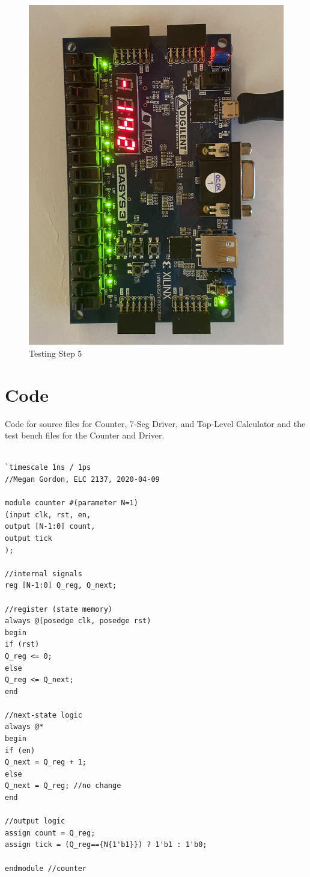 \documentclass[11pt]{article}
\begin{document}
\begin{figure}[ht]\centering
	\includegraphics[angle=0, width=1.0\textwidth]{IMG_6750.jpg}
	\caption{Testing Step 5}
	\label{fig:sim_with_table}
\end{figure}
\clearpage

\section*{Code}

Code for source files for Counter, 7-Seg Driver, and Top-Level Calculator and the test bench files for the Counter and Driver.

\begin{lstlisting}[style=Verilog,caption=Counter Code,label=code:ex ]

`timescale 1ns / 1ps
//Megan Gordon, ELC 2137, 2020-04-09

module counter #(parameter N=1)
(input clk, rst, en,
output [N-1:0] count,
output tick
);

//internal signals
reg [N-1:0] Q_reg, Q_next;

//register (state memory)
always @(posedge clk, posedge rst)
begin
if (rst)
Q_reg <= 0;
else
Q_reg <= Q_next;
end

//next-state logic
always @*
begin
if (en)
Q_next = Q_reg + 1;
else
Q_next = Q_reg; //no change
end

//output logic
assign count = Q_reg;
assign tick = (Q_reg=={N{1'b1}}) ? 1'b1 : 1'b0;

endmodule //counter

\end{lstlisting}
\clearpage
\end{document}
